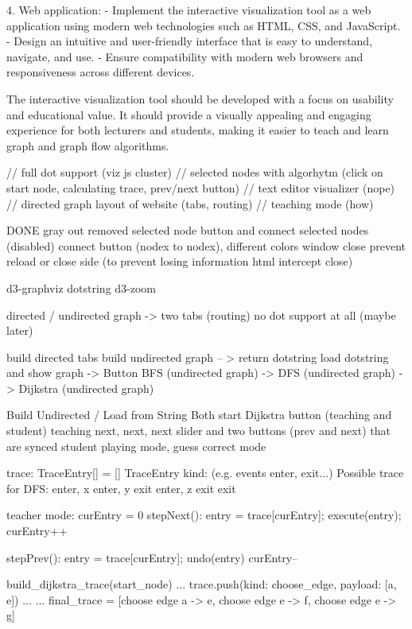\documentclass[options]{article}
\begin{document}
4. Web application:
   - Implement the interactive visualization tool as a web application using modern web technologies such as HTML, CSS, and JavaScript.
   - Design an intuitive and user-friendly interface that is easy to understand, navigate, and use.
   - Ensure compatibility with modern web browsers and responsiveness across different devices.

The interactive visualization tool should be developed with a focus on usability and educational value. It should provide a
visually appealing and engaging experience for both lecturers and students, making it easier to teach and learn graph and graph flow algorithms.


// full dot support (viz js cluster)
// selected nodes with algorhytm (click on start node, calculating trace, prev/next button)
// text editor visualizer (nope)
// directed graph 
layout of website (tabs, routing)
// teaching mode (how)


DONE gray out removed selected node button and connect selected nodes (disabled)
connect button (nodex to nodex), different colors
window close prevent reload or close side (to prevent losing information html intercept close)

d3-graphviz dotstring
d3-zoom

directed / undirected graph -> two tabs (routing) 
no dot support at all (maybe later)

build directed tabs
build undirected graph
-- > return dotstring
load dotstring and show graph
-> Button BFS (undirected graph)
-> DFS (undirected graph)
-> Dijkstra (undirected graph)

Build Undirected / Load from String
Both start Dijkstra button (teaching and student)
teaching next, next, next
   slider and two buttons (prev and next) that are synced
student playing mode, guess correct mode

trace: TraceEntry[] = []
TraceEntry {
   kind: (e.g. events enter, exit...)
}
Possible trace for DFS:
enter, x
enter, y
exit
enter, z
exit
exit

teacher mode:
curEntry = 0
stepNext():
entry = trace[curEntry];
execute(entry);
curEntry++

stepPrev():
entry = trace[curEntry];
undo(entry)
curEntry--

build_dijkstra_trace(start_node)
   ...
   trace.push(kind: choose_edge, payload: [a, e])
   ...
   ...
final_trace = [choose edge a -> e, choose edge e -> f, choose edge e -> g]
\end{document}
